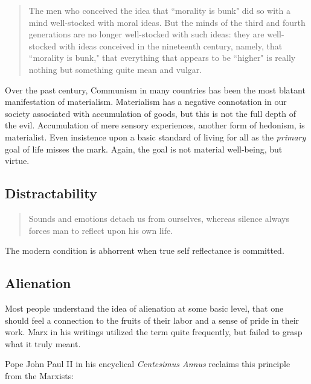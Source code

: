 \documentclass[letterpaper]{article}
\begin{document}
\begin{quote}
  The men who conceived the idea that ``morality is bunk" did so with a mind well-stocked with moral ideas. But the minds of the third and fourth generations are no longer well-stocked with such ideas: they are well-stocked with ideas conceived in the nineteenth century, namely, that ``morality is bunk," that everything that appears to be ``higher" is really nothing but something quite mean and vulgar.
\end{quote}

Over the past century, Communism in many countries has been the most blatant manifestation of materialism. Materialism has a negative connotation in our society associated with accumulation of goods, but this is not the full depth of the evil. Accumulation of mere sensory experiences, another form of hedonism, is materialist. Even insistence upon a basic standard of living for all as the \textit{primary} goal of life misses the mark. Again, the goal is not material well-being, but virtue.

\subsection{Distractability}

\begin{quote}
  Sounds and emotions detach us from ourselves, whereas silence always forces man to reflect upon his own life.
\end{quote}

The modern condition is abhorrent when true self reflectance is committed.

\hfill

\hfill

\hfill

\hfill

\subsection{Alienation}

Most people understand the idea of alienation at some basic level, that one should feel a connection to the fruits of their labor and a sense of pride in their work. Marx in his writings utilized the term quite frequently, but failed to grasp what it truly meant.

Pope John Paul II in his encyclical \textit{Centesimus Annus} reclaims this principle from the Marxists:
\end{document}
